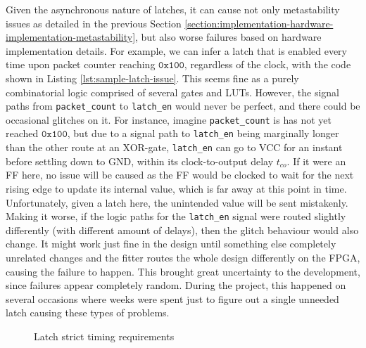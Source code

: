 \documentclass[a4paper]{report}
\newcommand{\code}{\texttt}
\begin{document}
Given the asynchronous nature of latches, it can cause not only metastability issues as detailed in the previous Section \ref{section:implementation-hardware-implementation-metastability}, but also worse failures based on hardware implementation details. For example, we can infer a latch that is enabled every time upon packet counter reaching $\mathtt{0x100}$, regardless of the clock, with the code shown in Listing \ref{lst:sample-latch-issue}. This seems fine as a purely combinatorial logic comprised of several gates and LUTs. However, the signal paths from \code{packet\_count} to \code{latch\_en} would never be perfect, and there could be occasional glitches on it. For instance, imagine \code{packet\_count} is has not yet reached $\mathtt{0x100}$, but due to a signal path to \code{latch\_en} being marginally longer than the other route at an XOR-gate, \code{latch\_en} can go to VCC for an instant before settling down to GND, within its clock-to-output delay $t_{co}$. If it were an FF here, no issue will be caused as the FF would be clocked to wait for the next rising edge to update its internal value, which is far away at this point in time. Unfortunately, given a latch here, the unintended value will be sent mistakenly. Making it worse, if the logic paths for the \code{latch\_en} signal were routed slightly differently (with different amount of delays), then the glitch behaviour would also change. It might work just fine in the design until something else completely unrelated changes and the fitter routes the whole design differently on the FPGA, causing the failure to happen. This brought great uncertainty to the development, since failures appear completely random. During the project, this happened on several occasions where weeks were spent just to figure out a single unneeded latch causing these types of problems.

\begin{figure}[h!]
  \caption{Latch strict timing requirements \cite{jensen-2020}}
  \label{fig:latch-timing}
\end{figure}
\end{document}

